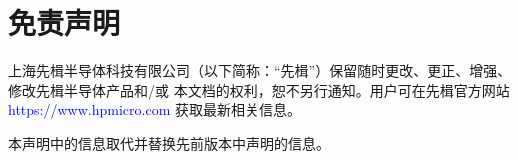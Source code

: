 \documentclass[AutoFakeBold,hyperref, UTF8]{ctexart}
\begin{document}
     
	 
    \begin{centering}
    \pagestyle{fancy} 	
    \tableofcontents\thispagestyle{fancy}
    \newpage
    \pagestyle{fancy} 
    \end{centering}

    
	
    

	\newpage
	\def\sectionabstract{免责声明}
	\section*{免责声明}
	上海先楫半导体科技有限公司（以下简称：“先楫”）保留随时更改、更正、增强、修改先楫半导体产品和/或
	本文档的权利，恕不另行通知。用户可在先楫官方网站
	\hypertarget{https://www.hpmicro.com}{\textcolor{blue}{https://www.hpmicro.com}}
	获取最新相关信息。\par
	
	
	本声明中的信息取代并替换先前版本中声明的信息。\par
        
        
        

     
\end{document}
